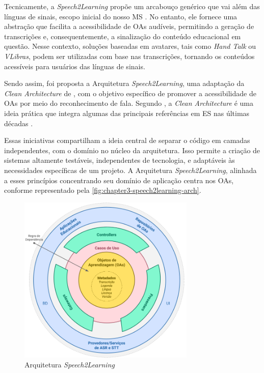 Tecnicamente, a \textit{Speech2Learning} propõe um arcabouço genérico que vai além das línguas de sinais, escopo inicial do nosso MS \cite{FalvoJr2020_SBIE, FalvoJr2020_FIE, FalvoJr2021_RENOTE}. No entanto, ele fornece uma abstração que facilita a acessibilidade de OAs audíveis, permitindo a geração de transcrições e, consequentemente, a sinalização do conteúdo educacional em questão. Nesse contexto, soluções baseadas em avatares, tais como \textit{Hand Talk} ou \textit{VLibras}, podem ser utilizadas com base nas transcrições, tornando os conteúdos acessíveis para usuários das línguas de sinais.

Sendo assim, foi proposta a Arquitetura \textit{Speech2Learning}, uma adaptação da \textit{Clean Architecture} de , com o objetivo específico de promover a acessibilidade de OAs por meio do reconhecimento de fala. Segundo , a \textit{Clean Architecture} é uma ideia prática que integra algumas das principais referências em ES nas últimas décadas \cite{cockburn2005, freeman2009, palermo2008, coplien2012, reenskaug2009, jacobson1992}. 

Essas iniciativas compartilham a ideia central de separar o código em camadas independentes, com o domínio no núcleo da arquitetura. Isso permite a criação de sistemas altamente testáveis, independentes de tecnologia, e adaptáveis às necessidades específicas de um projeto. A Arquitetura \textit{Speech2Learning}, alinhada a esses princípios concentrando seu domínio de aplicação centra nos OAs, conforme representado pela \autoref{fig:chapter3-speech2learning-arch}. 

\begin{figure}[htb]
\centering
\caption{Arquitetura \textit{Speech2Learning}}
\label{fig:chapter3-speech2learning-arch}
\includegraphics[width=0.75\textwidth]{images/chapter3-speech2learning-arch.png}
\end{figure}

